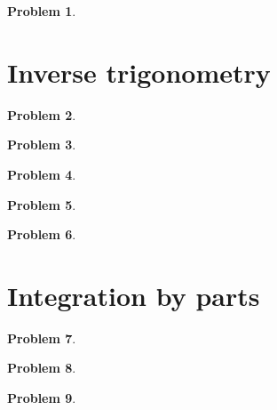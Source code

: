 \documentclass{article}
\newtheorem{problem}{Problem}
\begin{document}
\begin{problem}

\end{problem}
\section{Inverse trigonometry}
\begin{problem}

\end{problem}


\begin{problem}

\end{problem}


\begin{problem}

\end{problem}


\begin{problem}

\end{problem}

\begin{problem}

\end{problem}

\section{Integration by parts}
\begin{problem}

\end{problem}

\begin{problem}

\end{problem}

\begin{problem}

\end{problem}

\end{document}
